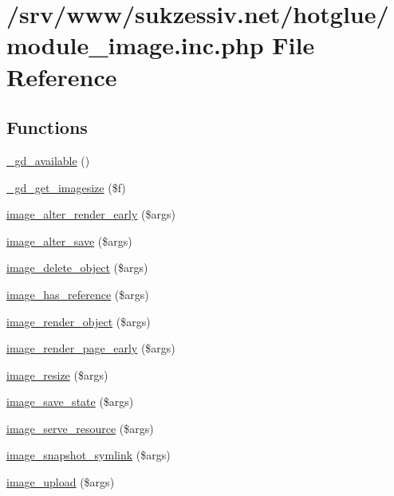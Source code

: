\hypertarget{module__image_8inc_8php}{
\section{/srv/www/sukzessiv.net/hotglue/module\_\-image.inc.php File Reference}
\label{module__image_8inc_8php}
}
\subsection*{Functions}
\begin{DoxyCompactItemize}
\item 
\hyperlink{module__image_8inc_8php_a574d6d760e50b88ffa815cab30a5e634}{\_\-gd\_\-available} ()
\item 
\hyperlink{module__image_8inc_8php_a3c76028c34273e722c9691243377a208}{\_\-gd\_\-get\_\-imagesize} (\$f)
\item 
\hyperlink{module__image_8inc_8php_ab52d6b71a5c26dbb7e86653652a23251}{image\_\-alter\_\-render\_\-early} (\$args)
\item 
\hyperlink{module__image_8inc_8php_a93578776fb38b10d47bc711cc3469ae9}{image\_\-alter\_\-save} (\$args)
\item 
\hyperlink{module__image_8inc_8php_a7cbcf6138ccff16a8b733cfd6f0f1666}{image\_\-delete\_\-object} (\$args)
\item 
\hyperlink{module__image_8inc_8php_a0bef6164f5eafe368d251639cf6fe298}{image\_\-has\_\-reference} (\$args)
\item 
\hyperlink{module__image_8inc_8php_a4fadded2a225d1b5ea73404a84597620}{image\_\-render\_\-object} (\$args)
\item 
\hyperlink{module__image_8inc_8php_a8266a74a11a86a73e2aa3709388fd43f}{image\_\-render\_\-page\_\-early} (\$args)
\item 
\hyperlink{module__image_8inc_8php_a9e03a71310133176236ae0bd4a0241e0}{image\_\-resize} (\$args)
\item 
\hyperlink{module__image_8inc_8php_ac26ea1448f0b7ed835907cf7c22b60ca}{image\_\-save\_\-state} (\$args)
\item 
\hyperlink{module__image_8inc_8php_abb6646bfaa6a012e620cdaaa0bc3c807}{image\_\-serve\_\-resource} (\$args)
\item 
\hyperlink{module__image_8inc_8php_a65d33fafe2da58d0f87f2df1fedbbe62}{image\_\-snapshot\_\-symlink} (\$args)
\item 
\hyperlink{module__image_8inc_8php_a37dee9de60e2852c0631d8e60e58585c}{image\_\-upload} (\$args)
\end{DoxyCompactItemize}


